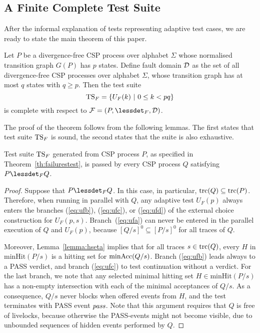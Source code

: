 \subsection{A Finite Complete Test Suite}

After the informal explanation of tests representing adaptive test cases, we are ready to state the main theorem of this paper.

\begin{theorem}\label{th:failurestest}
Let $P$ be a divergence-free CSP process over alphabet $\Sigma$
whose normalised transition graph $G(P)$ has $p$ states. Define fault domain ${\cal D}$ as
the set of all divergence-free CSP processes over alphabet $\Sigma$, whose transition graph
has at most $q$ states with $q \ge p$.
Then the test suite
\[
{\text{TS}}_F = \{ U_F(k)~|~0 \le k < pq  \}
\]
is complete with respect to ${\cal F} = (P,\lessdet_F,{\cal D})$.
\end{theorem}


The proof of the theorem follows from the following lemmas. The first states that test
suite ${\text{TS}}_F$ is sound, the second states that the suite is also exhaustive.

\begin{lemma}\label{lemma:mainfsound}
Test suite ${\text{TS}}_F$ generated from CSP process $P$, as specified in Theorem~\ref{th:failurestest}, is passed by
every CSP process $Q$ satisfying $P\lessdet_F Q$.
\end{lemma}
\begin{proof}
Suppose that $P\lessdet_F Q$. In this case, in particular, $\text{trc}(Q)\subseteq
\text{trc}(P)$. Therefore, when running in parallel with $Q$, any adaptive test
$U_F(p)$ always enters the branches (\ref{eq:ufb}), (\ref{eq:ufc}), or
(\ref{eq:ufd}) of the external choice construction for $U_F(p,s)$.
Branch~(\ref{eq:ufa}) can never be entered in the parallel execution of $Q$
and $U_F(p)$, because $[Q/s]^0\subseteq [P/s]^0$ for all traces of $Q$.

Moreover,  Lemma~\ref{lemma:hseta}
implies that for all traces $s\in\text{trc}(Q)$, every $H$ in $\text{minHit}(P/s)$ is
a hitting set for $\text{minAcc}(Q/s)$. Branch (\ref{eq:ufb}) leads always to a PASS verdict, and branch
(\ref{eq:ufc}) to test continuation without a verdict. For the last branch,
we note that any selected minimal hitting set $H\in\text{minHit}(P/s)$ has a
non-empty intersection with each of the minimal acceptances of $Q/s$. As a
consequence, $Q/s$ never blocks when offered events from $H$, and the test
terminates with PASS event ${\text{\it pass}}$. Note that this argument requires that
$Q$ is free of livelocks, because otherwise the PASS-events might not become
visible, due to unbounded sequences of hidden events performed by $Q$.
\xbox
\end{proof}

